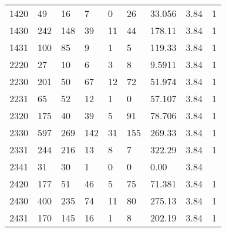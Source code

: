 \begin{longtable}{lllllllll}
1420 & 49            & 16               & 7                  & 0                & 26                 & \cellcolor[HTML]{9AFF99}33.056 & 3.84 & \cellcolor[HTML]{FFCC67}1 \\
1430 & 242           & 148              & 39                 & 11               & 44                 & \cellcolor[HTML]{9AFF99}178.11 & 3.84 & \cellcolor[HTML]{FFCC67}1 \\
1431 & 100           & 85               & 9                  & 1                & 5                  & \cellcolor[HTML]{9AFF99}119.33 & 3.84 & \cellcolor[HTML]{FFCC67}1 \\
2220 & 27            & 10               & 6                  & 3                & 8                  & \cellcolor[HTML]{9AFF99}9.5911 & 3.84 & \cellcolor[HTML]{FFCC67}1 \\
2230 & 201           & 50               & 67                 & 12               & 72                 & \cellcolor[HTML]{9AFF99}51.974 & 3.84 & \cellcolor[HTML]{FFCC67}1 \\
2231 & 65            & 52               & 12                 & 1                & 0                  & \cellcolor[HTML]{9AFF99}57.107 & 3.84 & \cellcolor[HTML]{FFCC67}1 \\
2320 & 175           & 40               & 39                 & 5                & 91                 & \cellcolor[HTML]{9AFF99}78.706 & 3.84 & \cellcolor[HTML]{FFCC67}1 \\
2330 & 597           & 269              & 142                & 31               & 155                & \cellcolor[HTML]{9AFF99}269.33 & 3.84 & \cellcolor[HTML]{FFCC67}1 \\
2331 & 244           & 216              & 13                 & 8                & 7                  & \cellcolor[HTML]{9AFF99}322.29 & 3.84 & \cellcolor[HTML]{FFCC67}1 \\
2341 & 31            & 30               & 1                  & 0                & 0                  & \cellcolor[HTML]{FFCCC9}0.00   & 3.84 &  \\
2420 & 177           & 51               & 46                 & 5                & 75                 & \cellcolor[HTML]{9AFF99}71.381 & 3.84 & \cellcolor[HTML]{FFCC67}1 \\
2430 & 400           & 235              & 74                 & 11               & 80                 & \cellcolor[HTML]{9AFF99}275.13 & 3.84 & \cellcolor[HTML]{FFCC67}1 \\
2431 & 170           & 145              & 16                 & 1                & 8                  & \cellcolor[HTML]{9AFF99}202.19 & 3.84 & \cellcolor[HTML]{FFCC67}1 \\

\end{longtable}
